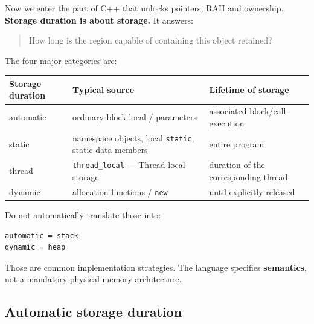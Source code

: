 Now we enter the part of C++ that unlocks pointers, RAII and ownership. \textbf{Storage duration is about storage.} It answers:

\begin{quote}
How long is the region capable of containing this object retained?
\end{quote}

The four major categories are:

{\def\LTcaptype{none} %
\begin{longtable}[]{@{}
  >{\raggedright\arraybackslash}p{}
  >{\raggedright\arraybackslash}p{}
  >{\raggedright\arraybackslash}p{}@{}}
\toprule\noalign{}
\begin{minipage}[b]{\linewidth}\raggedright
Storage duration
\end{minipage} & \begin{minipage}[b]{\linewidth}\raggedright
Typical source
\end{minipage} & \begin{minipage}[b]{\linewidth}\raggedright
Lifetime of storage
\end{minipage} \\
\midrule\noalign{}
\endhead
\bottomrule\noalign{}
\endlastfoot
automatic & ordinary block local / parameters & associated block/call execution \\
static & namespace objects, local \texttt{static}, static data members & entire program \\
thread & \texttt{thread\_local} --- \hyperref[appendix-3b88c6cd7195]{Thread-local storage} & duration of the corresponding thread \\
dynamic & allocation functions / \texttt{new} & until explicitly released \\
\end{longtable}
}

Do not automatically translate those into:

\begin{verbatim}
automatic = stack
dynamic = heap
\end{verbatim}

Those are common implementation strategies. The language specifies \textbf{semantics}, not a mandatory physical memory architecture.

\subsection{Automatic storage duration}\label{05-engine-i-ch002-automatic-storage-duration}

